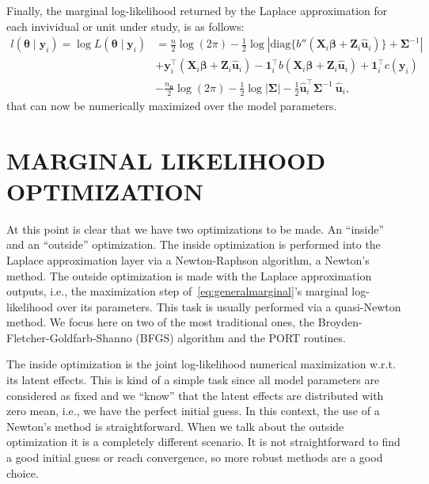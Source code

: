 Finally, the marginal log-likelihood returned by the Laplace
approximation for each invividual or unit under study, is as follows:
\begin{equation}
  \begin{aligned}
    l(\bm{\theta} \mid \mathbf{y}_{i}) =
    \log L(\bm{\theta} \mid \mathbf{y}_{i}) &=
    \frac{n}{2} \log (2 \pi) - \frac{1}{2} \log
    \left|
      \text{diag}\{{b}''(\mathbf{X}_{i}\bm{\beta} +
      \mathbf{Z}_{i}\mathbf{\hat{u}}_{i})\} + \bm{\Sigma}^{-1}
    \right|\\
    &+ \mathbf{y}_{i}^{\top}
    (\mathbf{X}_{i} \bm{\beta} + \mathbf{Z}_{i} \mathbf{\hat{u}}_{i}) -
    \mathbf{1}_{i}^{\top}
    b(\mathbf{X}_{i}\bm{\beta} + \mathbf{Z}_{i} \mathbf{\hat{u}}_{i}) +
    \mathbf{1}_{i}^{\top} c(\mathbf{y}_{i})\\
    &- \frac{n_{\mathbf{u}}}{2} \log (2 \pi) -
    \frac{1}{2} \log |\bm{\Sigma}| - \frac{1}{2}
    \mathbf{\hat{u}}_{i}^{\top}\bm{\Sigma}^{-1}~\mathbf{\hat{u}}_{i},
  \end{aligned}
  \nonumber
\end{equation}
that can now be numerically maximized over the model parameters.

\section{MARGINAL LIKELIHOOD OPTIMIZATION}
\label{cap:opt}

At this point is clear that we have two optimizations to be made. An
``inside'' and an ``outside'' optimization. The inside optimization is
performed into the Laplace approximation layer via a Newton-Raphson
algorithm, a Newton's method. The outside optimization is made with the
Laplace approximation outputs, i.e., the maximization step
of~\autoref{eq:generalmarginal}'s marginal log-likelihood over its
parameters. This task is usually performed via a quasi-Newton method. We
focus here on two of the most traditional ones, the
Broyden-Fletcher-Goldfarb-Shanno (BFGS) algorithm and the PORT routines.

The inside optimization is the joint log-likelihood numerical
maximization w.r.t. its latent effects. This is kind of a simple task
since all model parameters are considered as fixed and we ``know'' that
the latent effects are distributed with zero mean, i.e., we have the
perfect initial guess. In this context, the use of a Newton's method is
straightforward. When we talk about the outside optimization it is a
completely different scenario. It is not straightforward to find a good
initial guess or reach convergence, so more robust methods are a good
choice.

